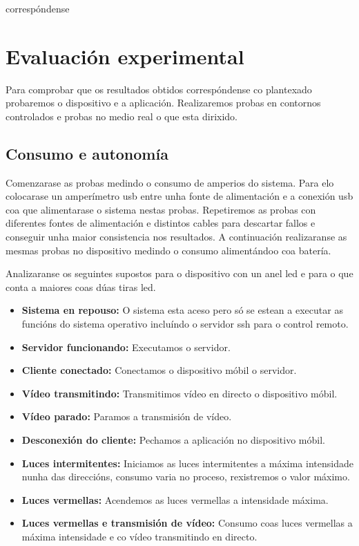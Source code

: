 correspóndense\chapter{Evaluación experimental}
\label{chap:evaluacion_experimenal}
Para comprobar que os resultados obtidos correspóndense co plantexado probaremos o dispositivo e a aplicación. Realizaremos probas en contornos controlados e probas no medio real o que esta dirixido.

\section{Consumo e autonomía}

Comenzarase as probas medindo o consumo de amperios do sistema. Para elo colocarase un amperímetro usb entre unha fonte de alimentación e a conexión usb coa que alimentarase o sistema nestas probas. Repetiremos as probas con diferentes fontes de alimentación e distintos cables para descartar fallos e conseguir unha maior consistencia nos resultados. A continuación realizaranse as mesmas probas no dispositivo medindo o consumo alimentándoo coa batería.

Analizaranse os seguintes supostos para o dispositivo con un anel led e para o que conta a maiores coas dúas tiras led.
\begin{itemize}
    \item \textbf{Sistema en repouso: }
    O sistema esta aceso pero só se estean a executar as funcións do sistema operativo incluíndo o servidor ssh para o control remoto.
    \item \textbf{Servidor funcionando:}
    Executamos o servidor.
    \item \textbf{Cliente conectado:}
    Conectamos o dispositivo móbil o servidor.
    \item \textbf{Vídeo transmitindo:}
    Transmitimos vídeo en directo o dispositivo móbil.
    \item \textbf{Vídeo parado:}
    Paramos a transmisión de vídeo.
    \item \textbf{Desconexión do cliente:}
    Pechamos a aplicación no dispositivo móbil.
    \item \textbf{Luces intermitentes:}
    Iniciamos as luces intermitentes a máxima intensidade nunha das direccións, consumo varia no proceso, rexistremos o valor máximo.
    \item \textbf{Luces vermellas:}
    Acendemos as luces vermellas a intensidade máxima.
    \item \textbf{Luces vermellas e transmisión de vídeo:}
    Consumo coas luces vermellas a máxima intensidade e co vídeo transmitindo en directo.
\end{itemize}

